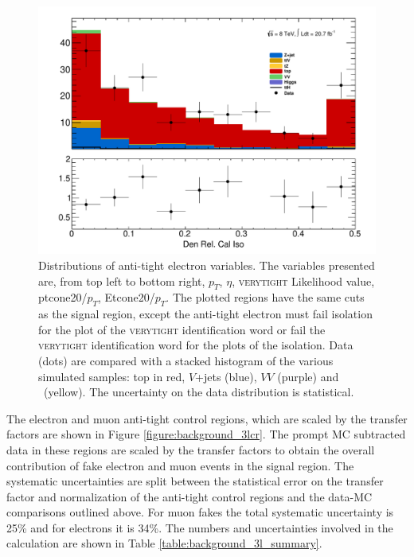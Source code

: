 \begin{figure}[!htbp]
\begin{minipage}[h]{0.5\textwidth}
    \centering \includegraphics[width=\textwidth]{figs/fake/aux_d1_Obj0EtIso20Rel}
  \end{minipage}\hfill
  \caption{Distributions of anti-tight electron variables. The variables presented are, from top left to bottom right, $p_T$, $\eta$, \textsc{verytight} Likelihood value, ptcone20/$p_T$, Etcone20/$p_T$. The plotted regions have the same cuts as the signal region, except the anti-tight electron must fail isolation for the plot of the \textsc{verytight} identification word or fail the \textsc{verytight} identification word for the plots of the isolation. Data (dots) are compared with a stacked histogram of the various simulated samples: top in red, $V$+jets (blue), $VV$ (purple) and \ttV\ (yellow). The uncertainty on the data distribution is statistical. }   
  \label{figure:background_electron_dataMC}
\end{figure} 
%

The electron and muon anti-tight control regions, which are scaled by the transfer factors are shown in Figure \ref{figure:background_3lcr}. The prompt MC subtracted data in these regions are scaled by the transfer factors to obtain the overall contribution of fake electron and muon events in the signal region. The systematic uncertainties are split between the statistical error on the transfer factor and normalization of the anti-tight control regions and the data-MC comparisons outlined above. For muon fakes the total systematic uncertainty is 25\% and for electrons it is 34\%. The numbers and uncertainties involved in the calculation are shown in Table \ref{table:background_3l_summary}.  


